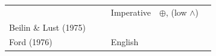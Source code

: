\documentclass[oneside]{report}
\theoremstyle{definition}
\theoremstyle{definition}
\theoremstyle{definition}
\theoremstyle{remark}
\begin{document}
\begin{longtable}[]{@{}lcclcc@{}}
\begin{minipage}[t]{0.09\columnwidth}
\strut
\end{minipage} & \begin{minipage}[t]{0.09\columnwidth}\centering\strut
\strut
\end{minipage} & \begin{minipage}[t]{0.06\columnwidth}\raggedright\strut
\strut
\end{minipage} & \begin{minipage}[t]{0.31\columnwidth}\centering\strut
Imperative\strut
\end{minipage} & \begin{minipage}[t]{0.12\columnwidth}\centering\strut
\(\oplus\), (low \(\land\))\strut
\end{minipage}\tabularnewline
\begin{minipage}[t]{0.17\columnwidth}\raggedright\strut
Beilin \& Lust (1975)\strut
\end{minipage} & \begin{minipage}[t]{0.09\columnwidth}\centering\strut
\strut
\end{minipage} & \begin{minipage}[t]{0.09\columnwidth}\centering\strut
\strut
\end{minipage} & \begin{minipage}[t]{0.06\columnwidth}\raggedright\strut
\strut
\end{minipage} & \begin{minipage}[t]{0.31\columnwidth}\centering\strut
\strut
\end{minipage} & \begin{minipage}[t]{0.12\columnwidth}\centering\strut
\strut
\end{minipage}\tabularnewline
\begin{minipage}[t]{0.17\columnwidth}\raggedright\strut
Ford (1976)\strut
\end{minipage} & \begin{minipage}[t]{0.09\columnwidth}\centering\strut
\strut
\end{minipage} & \begin{minipage}[t]{0.09\columnwidth}\centering\strut
\strut
\end{minipage} & \begin{minipage}[t]{0.06\columnwidth}\raggedright\strut
English\strut
\end{minipage} & \begin{minipage}[t]{0.31\columnwidth}\centering\strut
\strut
\end{minipage} & \begin{minipage}[t]{0.12\columnwidth}\centering\strut

\end{minipage}
\end{longtable}
\end{document}
